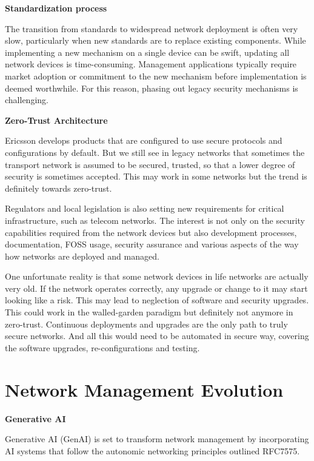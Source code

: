 \documentclass[11pt,sigconf]{iabart}
\begin{document}
\textbf{Standardization process}

The transition from standards to widespread network deployment is often very slow, particularly when new standards are to replace existing components. While implementing a new mechanism on a single device can be swift, updating all network devices is time-consuming. Management applications typically require market adoption or commitment to the new mechanism before implementation is deemed worthwhile. For this reason, phasing out legacy security mechanisms is challenging.
 
\textbf{Zero-Trust Architecture}

Ericsson develops products that are configured to use secure protocols and configurations by default. But we still see in legacy networks that sometimes the transport network is assumed to be secured, trusted, so that a lower degree of security is sometimes accepted. This may work in some networks but the trend is definitely towards zero-trust. 

Regulators and local legislation is also setting new requirements for critical infrastructure, such as telecom networks. The interest is not only on the security capabilities required from the network devices but also development processes, documentation, FOSS usage, security assurance and various aspects of the way how networks are deployed and managed.

One unfortunate reality is that some network devices in life networks are actually very old. If the network operates correctly, any upgrade or change to it may start looking like a risk. This may lead to neglection of software and security upgrades. This could work in the walled-garden paradigm but definitely not anymore in zero-trust. Continuous deployments and upgrades are the only path to truly secure networks. And all this would need to be automated in secure way, covering the software upgrades, re-configurations and testing.

 
\section{Network Management Evolution} \label{insights}




\textbf{Generative AI}

Generative AI (GenAI) is set to transform network management by incorporating AI systems that follow the autonomic networking principles outlined RFC7575.
\end{document}
